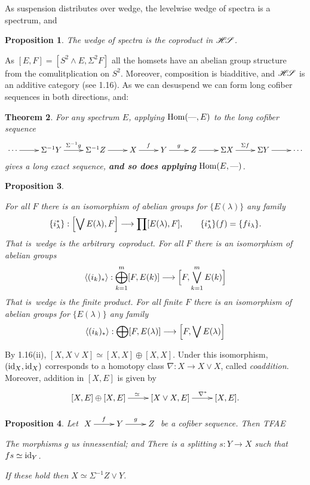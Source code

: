 \documentclass[11pt]{article}
\theoremstyle{plain}
\newtheorem{thm}{Theorem}[subsection]
\newtheorem{prop}[thm]{Proposition}
\theoremstyle{definition}
\newcommand{\HS}{\scrH\!\scrS}
\begin{document}
{As suspension distributes over wedge, the levelwise wedge of spectra is a
spectrum, and
\begin{prop}
The wedge of spectra is the coproduct in $\HS$.
\end{prop}
As $[E,F]=[S^2\wedge E,\Sigma^2F]$ all the homsets have an abelian group
structure from the comulitplication on $S^2$. Moreover, composition is
biadditive, and $\HS$ is an additive category (see 1.16). As we can desuspend we
can form long cofiber sequences in both directions, and:
\begin{thm}
For any spectrum $E$, applying $\Hom(\DASH,E)$ to the long cofiber sequence
\[\xymatrix{
\cdots\ar[r]&\Sigma^{-1}Y\ar[r]^{\Sigma^{-1}g}&
\Sigma^{-1}Z\ar[r]&X\ar[r]^f&
Y\ar[r]^g&Z\ar[r]&\Sigma X\ar[r]^{\Sigma f}&\Sigma Y\ar[r]&\cdots
}\]
gives a long exact sequence, \textbf{and so does applying} $\Hom(E,\DASH)$.
\end{thm}
\begin{prop}\hfil
\begin{itemise}
\itm[(i)]For all $F$ there is an isomorphism of abelian groups \lparen for
$\{E(\lambda)\}$ any family\rparen\upcol
\[\{i^*_\lambda\}:\Bigl[\bigvee E(\lambda),F\Bigr]\to\prod[E(\lambda),F],
\qquad\{i^*_\lambda\}(f)=\{fi_\lambda\}.\]
That is\upcol\ wedge is the \lparen arbitrary\rparen\ coproduct.
\itm[(ii)]For all $F$ there is an isomorphism of abelian groups\upcol
\[\langle(i_k)_*\rangle:\bigoplus_{k=1}^m[F,E(k)]\to
\Bigl[F,\bigvee_{k=1}^m E(k)\Bigr]\]
That is\upcol\ wedge is the finite product.
\itm[(iii)]For all finite $F$ there is an isomorphism of abelian groups \lparen
for $\{E(\lambda)\}$ any family\rparen\upcol
\[\langle(i_k)_*\rangle:\bigoplus[F,E(\lambda)]\to
\Bigl[F,\bigvee E(\lambda)\Bigr]\]
\end{itemise}
\end{prop}
\noindent By 1.16(ii), $[X,X\vee X]\simeq[X,X]\oplus[X,X]$. Under this
isomorphism, $(\id_X,\id_X)$ corresponds to a homotopy class $\nabla:X\to X\vee
X$, called \emph{coaddition}. Moreover, addition in $[X,E]$ is given by
\[\xymatrix{[X,E]\oplus[X,E]\ar[r]^{\ \ \simeq}&
[X\vee X,E]\ar[r]^{\ \ \ \nabla^*}&[X,E].}\]
\begin{prop}
Let $\xymatrix{X\ar[r]^f&Y\ar[r]^g&Z}$ be a cofiber sequence. Then TFAE\upcol
\begin{itemise}
\itm[(i)]The morphisms $g$ us innessential; and
\itm[(ii)]There is a splitting $s:Y\to X$ such that $fs\simeq\id_Y$.
\end{itemise}
If these hold then $X\simeq \Sigma^{-1}Z\vee Y$.
\end{prop}
}
\end{document}
